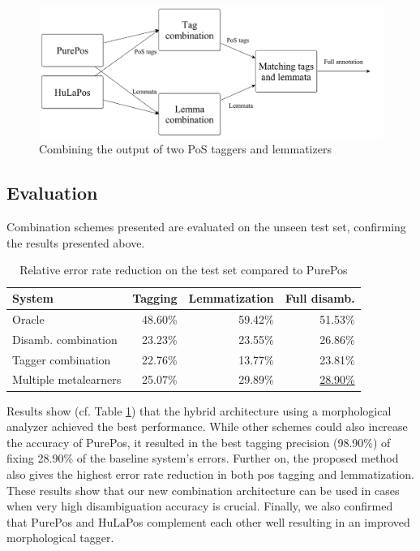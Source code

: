 \begin{figure}[H]
  \centering
  \includegraphics[scale=0.2]{MorphTagging/comb3.png} 
  \caption{Combining the output of two PoS taggers and lemmatizers}
  \label{fig:comb3}
\end{figure}

\subsection{Evaluation}

Combination schemes presented are evaluated on the unseen test set, confirming the results presented above.

\begin{table}[H]
\centering
\caption{Relative error rate reduction on the test set compared to PurePos}\label{tab:comb-eval}
\begin{tabular}{l r r r}
\hline
System & Tagging & Lemmatization & Full disamb. \\
\hline
Oracle & 48.60\% & 59.42\% & 51.53\% \\
Disamb. combination & 23.23\% & 23.55\% & 26.86\% \\
Tagger combination & 22.76\% & 13.77\% & 23.81\% \\
Multiple metalearners & 25.07\% & 29.89\% & \underline{28.90\%} \\
\hline
\end{tabular}
\end{table}

Results show (cf. Table \ref{tab:comb-eval}) that the hybrid architecture using a morphological analyzer achieved the best performance.
While other schemes could also increase the accuracy of PurePos, it resulted in the best tagging precision (98.90\%) of fixing 28.90\% of the baseline system's errors.
Further on, the proposed method also gives the highest error rate reduction in both \acrshort{pos} tagging and lemmatization.
These results show that our new combination architecture can be used in cases when very high disambiguation accuracy is crucial.
Finally, we also confirmed that PurePos and HuLaPos complement each other well resulting in an improved morphological tagger. 



 

 

 

 
